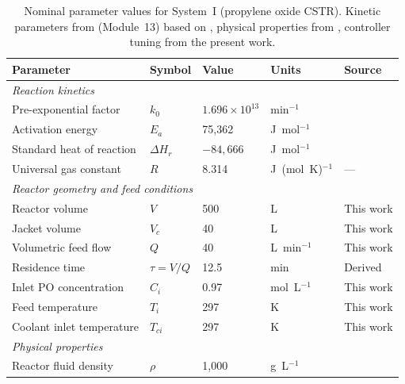 \documentclass[aps,pre,twocolumn,superscriptaddress,floatfix]{revtex4-2}
\begin{document}
\begin{table}[tb]
\centering
\caption{Nominal parameter values for System~I (propylene oxide
  CSTR). Kinetic parameters from \citet{Fogler2016}
  (Module~13) based on \citet{Furusawa1969}, physical properties from
  \citet{PerrysHandbook}, controller tuning from the present work.}
\label{tab:params_system1}
\small
\begin{tabular}{lllll}
\toprule
Parameter & Symbol & Value & Units & Source \\
\hline
\midrule
\multicolumn{5}{l}{\textit{Reaction kinetics}} \\
Pre-exponential factor     & $k_0$          & $1.696\times10^{13}$ & min$^{-1}$            & \citet{Fogler2016} \\
Activation energy          & $E_a$          & 75{,}362             & J~mol$^{-1}$          & \citet{Fogler2016} \\
Standard heat of reaction  & $\Delta H_r$   & $-84{,}666$          & J~mol$^{-1}$          & \citet{Fogler2016,Ziyai2022} \\
Universal gas constant     & $R$            & 8.314                & J~(mol~K)$^{-1}$      & — \\
\midrule
\multicolumn{5}{l}{\textit{Reactor geometry and feed conditions}} \\
Reactor volume             & $V$            & 500                  & L                     & This work \\
Jacket volume              & $V_c$          & 40                   & L                     & This work \\
Volumetric feed flow       & $Q$            & 40                   & L~min$^{-1}$          & This work \\
Residence time             & $\tau = V/Q$   & 12.5                 & min                   & Derived \\
Inlet PO concentration     & $C_i$          & 0.97                 & mol~L$^{-1}$          & This work \\
Feed temperature           & $T_i$          & 297                  & K                     & This work \\
Coolant inlet temperature  & $T_{ci}$       & 297                  & K                     & This work \\
\midrule
\multicolumn{5}{l}{\textit{Physical properties}} \\
Reactor fluid density      & $\rho$         & 1{,}000              & g~L$^{-1}$            & \citet{PerrysHandbook} \\

\end{tabular}
\end{table}
\end{document}
